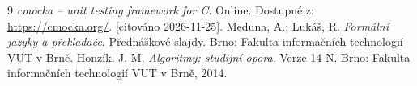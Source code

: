 \begin{thebibliography}{9}
    \textit{cmocka -- unit testing framework for C}. Online. Dostupné z: \url{https://cmocka.org/}. [citováno 2026-11-25].
    Meduna, A.; Lukáš, R. \textit{Formální jazyky a překladače}. Přednáškové slajdy. Brno: Fakulta informačních technologií VUT v Brně.
    Honzík, J. M. \textit{Algoritmy: studijní opora}. Verze 14-N. Brno: Fakulta informačních technologií VUT v Brně, 2014.
\end{thebibliography}
